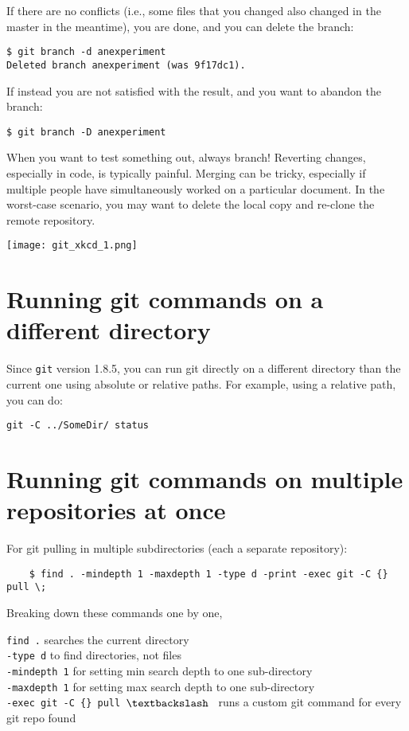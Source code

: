 If there are no conflicts (i.e., some files that you changed also
changed in the master in the meantime), you are done, and you can
delete the branch:

\begin{lstlisting} 
$ git branch -d anexperiment
Deleted branch anexperiment (was 9f17dc1).
\end{lstlisting}

If instead you are not satisfied with the result, and you want to
abandon the branch:
\begin{lstlisting} 
$ git branch -D anexperiment
\end{lstlisting}

When you want to test something out, always branch! Reverting changes, 
especially in code, is typically painful. Merging can be tricky, 
especially if multiple people have simultaneously worked on a 
particular document. In the worst-case scenario, you may want to delete 
the local copy and re-clone the remote repository.

\begin{center}
	\texttt{[image: git\_xkcd\_1.png]}
\end{center}
	
\section{Running git commands on a different directory}

Since {\tt git} version 1.8.5, you can run git directly on a 
different directory than the current one using absolute or relative 
paths. For example, using a relative path, you can do:
\begin{lstlisting}
git -C ../SomeDir/ status
\end{lstlisting}

\section{Running git commands on multiple repositories at once}
For git pulling in multiple subdirectories (each a separate 
repository):

\begin{lstlisting}
	$ find . -mindepth 1 -maxdepth 1 -type d -print -exec git -C {} pull \;
\end{lstlisting} 

Breaking down these commands one by one,

{\tt find .} searches the current directory\\
{\tt -type d} to find directories, not files\\
{\tt -mindepth 1} for setting min search depth to one sub-directory\\
{\tt -maxdepth 1} for setting max search depth to one sub-directory\\
{\tt -exec git -C \{\} pull $\textbackslash$ } runs a custom git command for every git repo found\\

